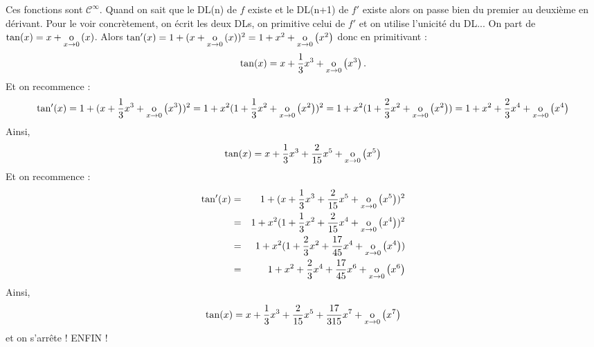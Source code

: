 \documentclass{magnolia}
\begin{document}
\begin{sol}
\begin{questions}
\question Ces fonctions sont $\mathcal{C}^{\infty}$.
 Quand on sait que le DL(n) de $f$ existe et le DL(n+1) de $f'$ existe alors on passe bien du premier au deuxième en dérivant. Pour le voir concrètement, on écrit les deux DLs, on primitive celui de $f'$ et on utilise l'unicité du DL...
\question On part de $\tan(x)=x+\underset{x \rightarrow 0}{\text{o}}\left(x\right)$. Alors $\tan'(x)=1+(x+\underset{x \rightarrow 0}{\text{o}}\left(x\right))^2=1+x^2+\underset{x \rightarrow 0}{\text{o}}\left(x^2\right)$ donc en primitivant :
$$\tan(x)=x+\dfrac{1}{3}x^3+\underset{x \rightarrow 0}{\text{o}}\left(x^3\right).$$
Et on recommence :
$$\tan'(x)=1+(x+\dfrac{1}{3}x^3+\underset{x \rightarrow 0}{\text{o}}\left(x^3\right))^2=1+x^2(1+\dfrac{1}{3}x^2+\underset{x \rightarrow 0}{\text{o}}\left(x^2\right))^2=1+x^2(1+\dfrac{2}{3}x^2+\underset{x \rightarrow 0}{\text{o}}\left(x^2\right))=1+x^2+\dfrac{2}{3}x^4+\underset{x \rightarrow 0}{\text{o}}\left(x^4\right)$$
Ainsi,
$$\tan(x)=x+\dfrac{1}{3}x^3+\dfrac{2}{15}x^5+\underset{x \rightarrow 0}{\text{o}}\left(x^5\right)$$
Et on recommence :
\begin{eqnarray*}
\tan'(x)&=& 1+(x+\dfrac{1}{3}x^3+\dfrac{2}{15}x^5+\underset{x \rightarrow 0}{\text{o}}\left(x^5\right))^2\\
&=& 1+x^2(1+\dfrac{1}{3}x^2+\dfrac{2}{15}x^4+\underset{x \rightarrow 0}{\text{o}}\left(x^4\right))^2\\
&=& 1+x^2(1+\dfrac{2}{3}x^2+\dfrac{17}{45}x^4+\underset{x \rightarrow 0}{\text{o}}\left(x^4\right))\\
&=& 1+x^2+\dfrac{2}{3}x^4+\dfrac{17}{45}x^6+\underset{x \rightarrow 0}{\text{o}}\left(x^6\right)
\end{eqnarray*}
Ainsi,
$$\tan(x)=x+\dfrac{1}{3}x^3+\dfrac{2}{15}x^5+\dfrac{17}{315}x^7+\underset{x \rightarrow 0}{\text{o}}\left(x^7\right)$$
et on s'arrête ! ENFIN !
\end{questions}



\end{sol}
\end{document}

